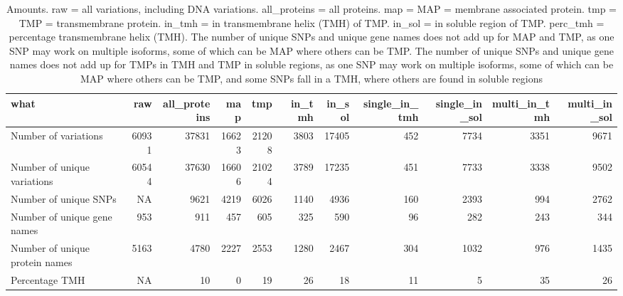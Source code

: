 \begin{table}

\caption{\label{tab:ncbi_counts}Amounts. raw = all variations, including DNA variations. all\_proteins = all proteins. map = MAP = membrane associated protein. tmp = TMP = transmembrane protein. in\_tmh = in transmembrane helix (TMH) of TMP. in\_sol = in soluble region of TMP. perc\_tmh = percentage transmembrane helix (TMH). The number of unique SNPs and unique gene names does not add up for MAP and TMP, as one SNP may work on multiple isoforms, some of which can be MAP where others can be TMP. The number of unique SNPs and unique gene names does not add up for TMPs in TMH and TMP in soluble regions, as one SNP may work on multiple isoforms, some of which can be MAP where others can be TMP, and some SNPs fall in a TMH, where others are found in soluble regions}
\centering
\begin{tabular}[t]{l|r|r|r|r|r|r|r|r|r|r}
\hline
what & raw & all\_proteins & map & tmp & in\_tmh & in\_sol & single\_in\_tmh & single\_in\_sol & multi\_in\_tmh & multi\_in\_sol\\
\hline
Number of variations & 60931 & 37831 & 16623 & 21208 & 3803 & 17405 & 452 & 7734 & 3351 & 9671\\
\hline
Number of unique variations & 60544 & 37630 & 16606 & 21024 & 3789 & 17235 & 451 & 7733 & 3338 & 9502\\
\hline
Number of unique SNPs & NA & 9621 & 4219 & 6026 & 1140 & 4936 & 160 & 2393 & 994 & 2762\\
\hline
Number of unique gene names & 953 & 911 & 457 & 605 & 325 & 590 & 96 & 282 & 243 & 344\\
\hline
Number of unique protein names & 5163 & 4780 & 2227 & 2553 & 1280 & 2467 & 304 & 1032 & 976 & 1435\\
\hline
Percentage TMH & NA & 10 & 0 & 19 & 26 & 18 & 11 & 5 & 35 & 26\\
\hline
\end{tabular}
\end{table}